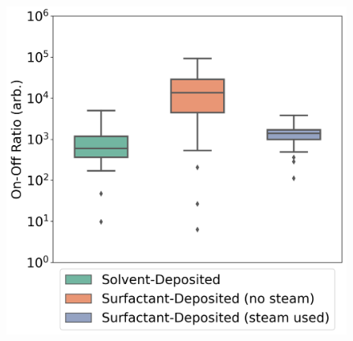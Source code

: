 \documentclass[
  letterpaper,
  DIV=11,
  numbers=noendperiod]{scrartcl}
\begin{document}
\begin{figure}
\begin{minipage}[t]{0.45\linewidth}
{{\includegraphics{figures/ch5/onoff_CNT.png}

}

}

\end{minipage}%
%
\begin{minipage}[t]{0.01\linewidth}

{\centering 

~

}

\end{minipage}%
%
\begin{minipage}[t]{0.03\linewidth}

{\centering 


}

\end{minipage}%
%
\begin{minipage}[t]{0.01\linewidth}

{\centering 

}
\end{minipage}
\end{figure}
\end{document}

